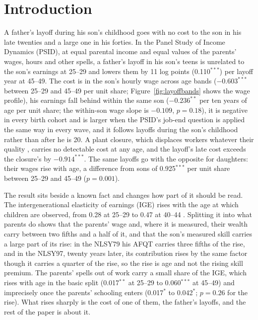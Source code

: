 \section{Introduction}\label{sec:intro}

A father's layoff during his son's childhood goes with no cost to the son in his late twenties and a large one in his
forties. In the Panel Study of Income Dynamics (PSID), at equal parental income and equal values of the parents' wages,
hours and other spells, a father's layoff in his son's teens is unrelated to the son's earnings at 25--29 and lowers
them by 11 log points (0.110$^{***}$) per layoff year at 45--49. The cost is in the son's hourly wage across age bands
($-0.603^{***}$ between 25--29 and 45--49 per unit share; Figure~\ref{fig:layoffbands} shows the wage profile), his
earnings fall behind within the same son ($-0.236^{**}$ per ten years of age per unit share; the within-son wage
slope is $-0.109$, $p = 0.18$), it is negative in every birth cohort and is larger when the PSID's job-end question is applied the same way in every wave, and it follows
layoffs during the son's childhood rather than after he is 20. A plant closure, which displaces workers whatever their
quality \citep{gibbons1991layoffs}, carries no detectable cost at any age, and the layoff's late cost exceeds the
closure's by $-0.914^{***}$. The same layoffs go with the opposite for daughters: their
wages rise with age, a difference from sons of 0.925$^{***}$ per unit share between 25--29 and 45--49 ($p = 0.001$).

The result sits beside a known fact and changes how part of it should be read. The intergenerational elasticity of
earnings (IGE) rises with the age at which children are observed, from 0.28 at 25--29 to 0.47 at 40--44
\citep{haider2006life, nybom2016heterogeneous}. Splitting it into what parents do shows that the parents' wage and, where
it is measured, their wealth carry between two fifths and a half of it, and that the son's measured skill carries a large part
of its rise: in the NLSY79 his AFQT carries three fifths of the rise, and in the NLSY97, twenty years later, its
contribution rises by the same factor though it carries a quarter of the rise, so the rise is age and not the rising
skill premium. The parents' spells out of work carry a small share of
the IGE, which rises with age in the basic split (0.017$^{**}$ at 25--29 to 0.060$^{***}$ at 45--49) and imprecisely
once the parents' schooling enters (0.017$^{*}$ to 0.042$^{*}$; $p = 0.26$ for the rise). What rises sharply is the
cost of one of them, the father's layoffs, and the rest of the paper is about it.

